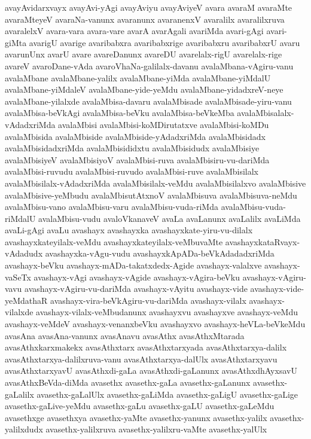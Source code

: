 {avayAvidarxvayx
avayAvi-yAgi
avayAviyu
avayAviyeV
avara
avaraM
avaraMte
avaraMteyeV
avaraNa-vanunx
avaranunx
avaranenxV
avaralilx
avaralilxruva
avaralelxV
avara-vara
avara-vare
avarA
avarAgali
avariMda
avari-gAgi
avari-giMta
avarigU
avarige
avaribabxra
avaribabxrige
avaribabxru
avaribabxrU
avaru
avarunUnx
avarU
avare
avareDanunx
avareDU
avarelalx-rigU
avarelalx-rige
avareV
avaroDane-vAda
avaroVhaNa-galilalx-davanu
avalaMbana-vAgiru-vanu
avalaMbane
avalaMbane-yalilx
avalaMbane-yiMda
avalaMbane-yiMdalU
avalaMbane-yiMdaleV
avalaMbane-yide-yeMdu
avalaMbane-yidadxreV-neye
avalaMbane-yilalxde
avalaMbisa-davaru
avalaMbisade
avalaMbisade-yiru-vanu
avalaMbisa-beVkAgi
avalaMbisa-beVku
avalaMbisa-beVkeMba
avalaMbisalalx-vAdadxriMda
avalaMbisi
avalaMbisi-koMDirutatxve
avalaMbisi-koMDu
avalaMbisida
avalaMbiside
avalaMbiside-yAdadxriMda
avalaMbisidadx
avalaMbisidadxriMda
avalaMbisididxtu
avalaMbisidudx
avalaMbisiye
avalaMbisiyeV
avalaMbisiyoV
avalaMbisi-ruva
avalaMbisiru-vu-dariMda
avalaMbisi-ruvudu
avalaMbisi-ruvudo
avalaMbisi-ruve
avalaMbisilalx
avalaMbisilalx-vAdadxriMda
avalaMbisilalx-veMdu
avalaMbisilalxvo
avalaMbisive
avalaMbisive-yeMbudu
avalaMbisutAtxnoV
avalaMbisuva
avalaMbisuva-neMdu
avalaMbisu-vano
avalaMbisu-varu
avalaMbisu-vuda-riMda
avalaMbisu-vuda-riMdalU
avalaMbisu-vudu
avaloVkanaveV
avaLa
avaLanunx
avaLalilx
avaLiMda
avaLi-gAgi
avaLu
avashayx
avashayxka
avashayxkate-yiru-vu-dilalx
avashayxkateyilalx-veMdu
avashayxkateyilalx-veMbuvaMte
avashayxkataRvayx-vAdadudx
avashayxka-vAgu-vudu
avashayxkApADa-beVkAdadadxriMda
avashayx-beVku
avashayx-mADa-takatxdedx-Agide
avashayx-valalxve
avashayx-vaSeTx
avashayx-vAgi
avashayx-vAgide
avashayx-vAgira-beVku
avashayx-vAgiru-vavu
avashayx-vAgiru-vu-dariMda
avashayx-vAyitu
avashayx-vide
avashayx-vide-yeMdathaR
avashayx-vira-beVkAgiru-vu-dariMda
avashayx-vilalx
avashayx-vilalxde
avashayx-vilalx-veMbudanunx
avashayxvu
avashayxve
avashayx-veMdu
avashayx-veMdeV
avashayx-venanxbeVku
avashayxvo
avashayx-heVLa-beVkeMdu
avasAna
avasAna-vanunx
avasAnavu
avasAthx
avasAthxMtarada
avasAthxkarxmakekx
avasAthxtarx
avasAthxtarxyada
avasAthxtarxya-dalilx
avasAthxtarxya-dalilxruva-vanu
avasAthxtarxya-dalUlx
avasAthxtarxyavu
avasAthxtarxyavU
avasAthxdi-gaLa
avasAthxdi-gaLanunx
avasAthxdhAyxsavU
avasAthxBeVda-diMda
avasethx
avasethx-gaLa
avasethx-gaLanunx
avasethx-gaLalilx
avasethx-gaLalUlx
avasethx-gaLiMda
avasethx-gaLigU
avasethx-gaLige
avasethx-gaLive-yeMdu
avasethx-gaLu
avasethx-gaLU
avasethx-gaLeMdu
avasethxge
avasethxya
avasethx-yaMte
avasethx-yanunx
avasethx-yalilx
avasethx-yalilxdudx
avasethx-yalilxruva
avasethx-yalilxru-vaMte
avasethx-yalUlx
}

